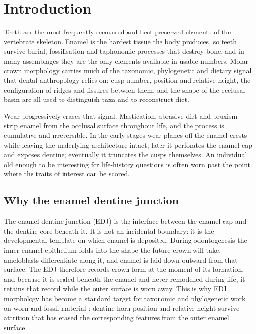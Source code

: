 \documentclass[10pt,a4paper,twocolumn]{article}
\begin{document}
\section{Introduction}
\label{sec:intro}

Teeth are the most frequently recovered and best preserved elements of the
vertebrate skeleton. Enamel is the hardest tissue the body produces, so teeth
survive burial, fossilisation and taphonomic processes that destroy bone, and in
many assemblages they are the only elements available in usable numbers. Molar
crown morphology carries much of the taxonomic, phylogenetic and dietary signal
that dental anthropology relies on: cusp number, position and relative height,
the configuration of ridges and fissures between them, and the shape of the
occlusal basin are all used to distinguish taxa and to reconstruct diet.

Wear progressively erases that signal. Mastication, abrasive diet and bruxism
strip enamel from the occlusal surface throughout life, and the process is
cumulative and irreversible. In the early stages wear planes off the enamel
crests while leaving the underlying architecture intact; later it perforates the
enamel cap and exposes dentine; eventually it truncates the cusps themselves. An
individual old enough to be interesting for life-history questions is often worn
past the point where the traits of interest can be scored.

\subsection{Why the enamel dentine junction}

The enamel dentine junction (EDJ) is the interface between the enamel cap and
the dentine core beneath it. It is not an incidental boundary: it is the
developmental template on which enamel is deposited. During odontogenesis the
inner enamel epithelium folds into the shape the future crown will take,
ameloblasts differentiate along it, and enamel is laid down outward from that
surface. The EDJ therefore records crown form at the moment of its formation,
and because it is sealed beneath the enamel and never remodelled during life, it
retains that record while the outer surface is worn away. This is why EDJ
morphology has become a standard target for taxonomic and phylogenetic work on
worn and fossil material \citep{skinner2008traits,skinner2008edj}: dentine horn
position and relative height survive attrition that has erased the corresponding
features from the outer enamel surface.
\end{document}
